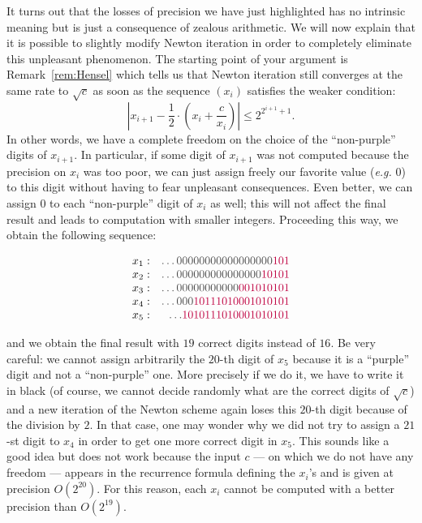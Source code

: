 \documentclass[11pt]{article}
\numberwithin{equation}{section}
\numberwithin{figure}{section}
\renewcommand{\leq}{\leqslant}
\theoremstyle{definition}
\begin{document}
\medskip

It turns out that the losses of precision we have just highlighted has 
no intrinsic meaning but is just a consequence of zealous 
arithmetic. We will now explain that it is possible to slightly modify 
Newton iteration in order to completely eliminate this 
unpleasant phenomenon. The starting point of your argument is 
Remark~\ref{rem:Hensel} which tells us that Newton iteration still 
converges at the same rate to $\sqrt c$ as soon as the sequence $(x_i)$ 
satisfies the weaker condition:
$$\left|x_{i+1} - 
\frac 1 2 \cdot \left( x_i + \frac
c{x_i}\right) \right| \leq 2^{2^{i+1}+1}.$$
In other words, we have a complete freedom on the choice of the 
``non-purple'' digits of $x_{i+1}$. In particular, if some digit of 
$x_{i+1}$ was not computed because the precision on $x_i$ was too poor, 
we can just assign freely our favorite value (\emph{e.g.} $0$) to this 
digit without having to fear unpleasant consequences. Even better, we 
can assign $0$ to each ``non-purple'' digit of $x_i$ as well; this will
not affect the final result and leads to computation with smaller
integers. 
Proceeding this way, we obtain the following sequence:

$$\begin{array}{lrr}
x_1: & %
 {\color{black!70}\ldots00000000000000000}{\color{purple}101} \\
x_2: & %
 {\color{black!70}\ldots000000000000000}{\color{purple}10101} \\
x_3: & %
 {\color{black!70}\ldots00000000000}{\color{purple}001010101} \\
x_4: & %
 {\color{black!70}\ldots000}{\color{purple}10111010001010101} \\
x_5: & %
 {\color{black!70}\ldots}{\color{purple}1010111010001010101}
\end{array}$$

\noindent
and we obtain the final result with $19$ correct digits instead of $16$. 
Be very careful: we cannot assign arbitrarily the $20$-th digit of $x_5$ 
because it is a ``purple'' digit and not a ``non-purple'' one.
More precisely if we do it, we have to write it in black (of course, we 
cannot decide randomly what are the correct digits of $\sqrt c$) and a 
new iteration of the Newton scheme again loses this $20$-th digit
because of the division by $2$.
In that case, one may wonder why we did not try to assign a $21$-st digit to 
$x_4$ in order to get one more correct digit in $x_5$. This sounds like
a good idea but does not work because the input $c$ --- on which we do 
not have any freedom --- appears in the recurrence formula defining the 
$x_i$'s and is given at precision $O(2^{20})$. For this reason, each 
$x_i$ cannot be computed with a better precision than $O(2^{19})$.
\end{document}
